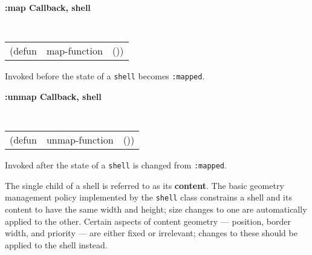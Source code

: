 {\samepage
{\large {\bf :map \hfill Callback, shell}} 
\begin{flushright} 
\parbox[t]{6.125in}{
\tt
\begin{tabular}{lll}
\raggedright
(defun & map-function & ())
\end{tabular}
\rm

}\end{flushright}}

\begin{flushright} \parbox[t]{6.125in}{
Invoked before the state of a {\tt shell} becomes {\tt :mapped}.

}\end{flushright}


{\samepage
{\large {\bf :unmap \hfill Callback, shell}} 
\begin{flushright} 
\parbox[t]{6.125in}{
\tt
\begin{tabular}{lll}
\raggedright
(defun & unmap-function & ())
\end{tabular}
\rm

}\end{flushright}}

\begin{flushright} \parbox[t]{6.125in}{
Invoked after the state of a {\tt shell} is changed from {\tt :mapped}.

}\end{flushright}


The single child of a shell is referred to as its {\bf content}. The basic geometry management policy implemented by the {\tt shell}
class constrains a shell and its content to have the same width and height;
size changes to one are automatically applied to the other. Certain aspects of
content geometry --- position, border width, and priority --- are either fixed
or irrelevant; changes to these should be applied to the shell instead.
        
